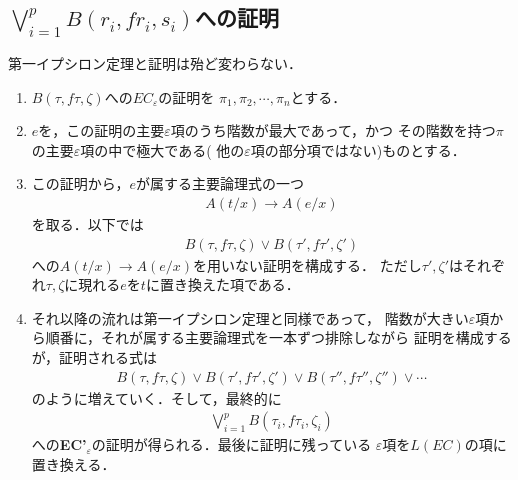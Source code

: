 \subsection{$\bigvee_{i=1}^{p} B(r_{i},fr_{i},s_{i})$への証明}
	第一イプシロン定理と証明は殆ど変わらない．
	
	\begin{enumerate}
		\item $B(\tau,f\tau,\zeta)$への$EC_{\varepsilon}$の証明を
			$\pi_{1},\pi_{2},\cdots,\pi_{n}$とする．
			
		\item $e$を，この証明の主要$\varepsilon$項のうち階数が最大であって，かつ
			その階数を持つ$\pi$の主要$\varepsilon$項の中で極大である(
			他の$\varepsilon$項の部分項ではない)ものとする．
		
		\item この証明から，$e$が属する主要論理式の一つ
			\begin{align}
				A(t/x) \rightarrow A(e/x)
			\end{align}
			を取る．以下では
			\begin{align}
				B(\tau,f\tau,\zeta) \vee B(\tau',f\tau',\zeta')
			\end{align}
			への$A(t/x) \rightarrow A(e/x)$を用いない証明を構成する．
			ただし$\tau',\zeta'$はそれぞれ$\tau,\zeta$に現れる$e$を$t$に置き換えた項である．
			
		\item それ以降の流れは第一イプシロン定理と同様であって，
			階数が大きい$\varepsilon$項から順番に，それが属する主要論理式を一本ずつ排除しながら
			証明を構成するが，証明される式は
			\begin{align}
				B(\tau,f\tau,\zeta) \vee B(\tau',f\tau',\zeta') \vee
				B(\tau'',f\tau'',\zeta'') \vee \cdots
			\end{align}
			のように増えていく．そして，最終的に
			\begin{align}
				\bigvee_{i=1}^{p} B(\tau_{i},f\tau_{i},\zeta_{i})
			\end{align}
			への{\bf EC'}${}_{\varepsilon}$の証明が得られる．最後に証明に残っている
			$\varepsilon$項を$L(EC)$の項に置き換える．
	\end{enumerate}
	
